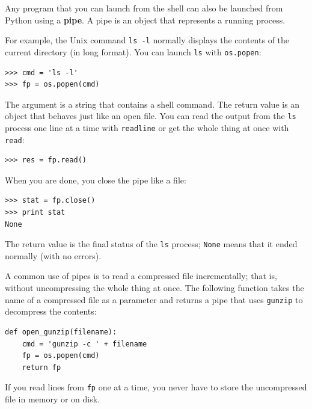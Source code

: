 \documentclass[10pt]{book}
\begin{document}
{

Any program that you can launch from the shell can also be
launched from Python using a {\bf pipe}.  A pipe is an object
that represents a running process.

For example, the Unix command {\tt ls -l} normally displays the
contents of the current directory (in long format).  You can
launch {\tt ls} with {\tt os.popen}:


\beforeverb
\begin{verbatim}
>>> cmd = 'ls -l'
>>> fp = os.popen(cmd)
\end{verbatim}
\afterverb
%
The argument is a string that contains a shell command.  The
return value is an object that behaves just like an open
file.  You can read the output from the {\tt ls} process one
line at a time with {\tt readline} or get the whole thing at
once with {\tt read}:


\beforeverb
\begin{verbatim}
>>> res = fp.read()
\end{verbatim}
\afterverb
%
When you are done, you close the pipe like a file:


\beforeverb
\begin{verbatim}
>>> stat = fp.close()
>>> print stat
None
\end{verbatim}
\afterverb
%
The return value is the final status of the {\tt ls} process;
{\tt None} means that it ended normally (with no errors).


A common use of pipes is to read a compressed file incrementally;
that is, without uncompressing the whole thing at once.  The
following function takes the name of a compressed file as a
parameter and returns a pipe that uses {\tt gunzip} to decompress
the contents:

\beforeverb
\begin{verbatim}
def open_gunzip(filename):
    cmd = 'gunzip -c ' + filename
    fp = os.popen(cmd)
    return fp
\end{verbatim}
\afterverb
%
If you read lines from {\tt fp} one at a time, you never have
to store the uncompressed file in memory or on disk.


}
\end{document}
